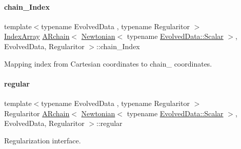 \paragraph{\texorpdfstring{chain_\+Index}{chainIndex}}
{\footnotesize\ttfamily template$<$typename Evolved\+Data , typename Regularitor $>$ \\
\mbox{\hyperlink{class_a_rchain_3_01_newtonian_3_01typename_01_evolved_data_1_1_scalar_01_4_00_01_evolved_data_00_01_regularitor_01_4_a0072f8585c3e6ba8d64cb81be90fb376}{Index\+Array}} \mbox{\hyperlink{class_a_rchain}{A\+Rchain}}$<$ \mbox{\hyperlink{class_newtonian}{Newtonian}}$<$ typename \mbox{\hyperlink{class_a_rchain_a707e42a79e4744424a34c9007e84ee07}{Evolved\+Data\+::\+Scalar}} $>$, Evolved\+Data, Regularitor $>$\+::chain_\+Index\hspace{0.3cm}{\ttfamily [private]}}



Mapping index from Cartesian coordinates to chain_ coordinates.

\mbox{\label{class_a_rchain_3_01_newtonian_3_01typename_01_evolved_data_1_1_scalar_01_4_00_01_evolved_data_00_01_regularitor_01_4_a6e5a31aa07620ab9f3503ebc412ff969}} 
\paragraph{\texorpdfstring{regular}{regular}}
{\footnotesize\ttfamily template$<$typename Evolved\+Data , typename Regularitor $>$ \\
Regularitor \mbox{\hyperlink{class_a_rchain}{A\+Rchain}}$<$ \mbox{\hyperlink{class_newtonian}{Newtonian}}$<$ typename \mbox{\hyperlink{class_a_rchain_a707e42a79e4744424a34c9007e84ee07}{Evolved\+Data\+::\+Scalar}} $>$, Evolved\+Data, Regularitor $>$\+::regular\hspace{0.3cm}{\ttfamily [private]}}



Regularization interface. 

